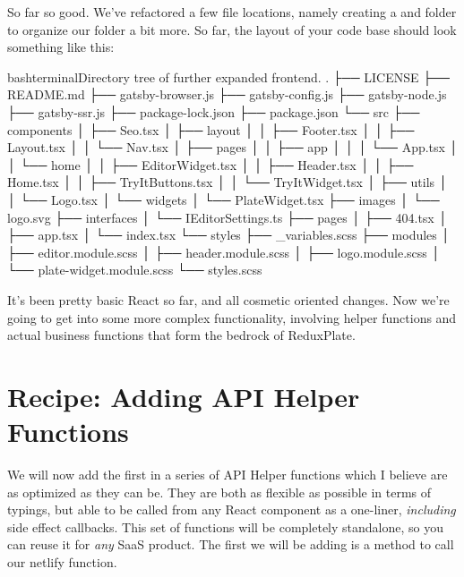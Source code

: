 \documentclass[paper=6in:9in,pagesize=pdftex,headinclude=on,footinclude=on,12pt,twoside]{scrbook}
\begin{document}
So far so good. We've refactored a few file locations, namely creating a  and  folder to organize our  folder a bit more. So far, the layout of your code base should look something like this:

\begin{codeInput}{bash}{terminal}{Directory tree of further expanded frontend.}
.
├── LICENSE
├── README.md
├── gatsby-browser.js
├── gatsby-config.js
├── gatsby-node.js
├── gatsby-ssr.js
├── package-lock.json
├── package.json
└── src
    ├── components
    │   ├── Seo.tsx
    │   ├── layout
    │   │   ├── Footer.tsx
    │   │   ├── Layout.tsx
    │   │   └── Nav.tsx
    │   ├── pages
    │   │   ├── app
    │   │   │   └── App.tsx
    │   │   └── home
    │   │       ├── EditorWidget.tsx
    │   │       ├── Header.tsx
    │   │       ├── Home.tsx
    │   │       ├── TryItButtons.tsx
    │   │       └── TryItWidget.tsx
    │   ├── utils
    │   │   └── Logo.tsx
    │   └── widgets
    │       └── PlateWidget.tsx
    ├── images
    │   └── logo.svg
    ├── interfaces
    │   └── IEditorSettings.ts
    ├── pages
    │   ├── 404.tsx
    │   ├── app.tsx
    │   └── index.tsx
    └── styles
        ├── _variables.scss
        ├── modules
        │   ├── editor.module.scss
        │   ├── header.module.scss
        │   ├── logo.module.scss
        │   └── plate-widget.module.scss
        └── styles.scss
\end{codeInput}

It's been pretty basic React so far, and all cosmetic oriented changes. Now we're going to get into some more complex functionality, involving helper functions and actual business functions that form the bedrock of ReduxPlate.

\section{Recipe: Adding API Helper Functions}

We will now add the first in a series of API Helper functions which I believe are as optimized as they can be. They are both as flexible as possible in terms of typings, but able to be called from any React component as a one-liner, \textit{including} side effect callbacks. This set of functions will be completely standalone, so you can reuse it for \textit{any} SaaS product. The first we will be adding is a  method to call our netlify function.
\end{document}
